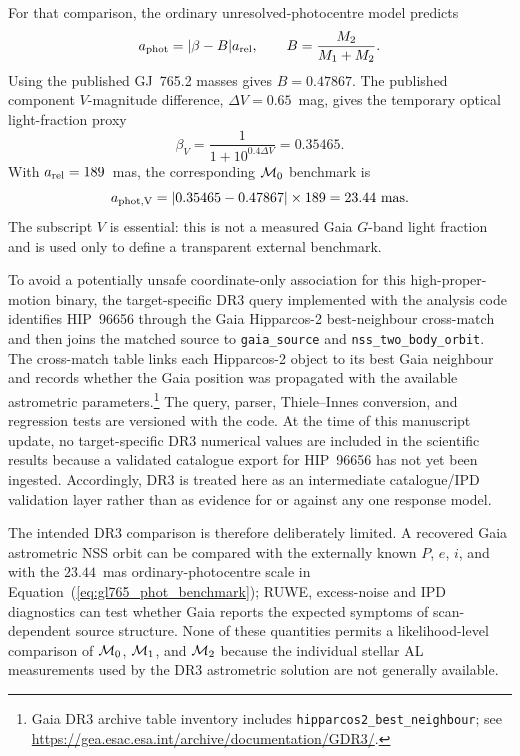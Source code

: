For that comparison, the ordinary unresolved-photocentre model predicts
\begin{equation}
 a_{\rm phot}=|\beta-B|a_{\rm rel},\qquad
 B=\frac{M_2}{M_1+M_2}.
\end{equation}
Using the published GJ~765.2 masses gives $B=0.47867$. The published component $V$-magnitude difference, $\Delta V=0.65$~mag, gives the temporary optical light-fraction proxy
\begin{equation}
\beta_V=\frac{1}{1+10^{0.4\Delta V}}=0.35465.
\label{eq:gl765_beta_v}
\end{equation}
With $a_{\rm rel}=189$~mas, the corresponding $\mathcal{M}_0$ benchmark is
\begin{equation}
 a_{\rm phot,V}=|0.35465-0.47867|\times189
 =23.44~{\rm mas}.
\label{eq:gl765_phot_benchmark}
\end{equation}
The subscript $V$ is essential: this is not a measured Gaia $G$-band light fraction and is used only to define a transparent external benchmark.

To avoid a potentially unsafe coordinate-only association for this high-proper-motion binary, the target-specific DR3 query implemented with the analysis code identifies HIP~96656 through the Gaia Hipparcos-2 best-neighbour cross-match and then joins the matched source to \texttt{gaia\_source} and \texttt{nss\_two\_body\_orbit}. The cross-match table links each Hipparcos-2 object to its best Gaia neighbour and records whether the Gaia position was propagated with the available astrometric parameters.\footnote{Gaia DR3 archive table inventory includes \texttt{hipparcos2\_best\_neighbour}; see \url{https://gea.esac.esa.int/archive/documentation/GDR3/}.} The query, parser, Thiele--Innes conversion, and regression tests are versioned with the code. At the time of this manuscript update, no target-specific DR3 numerical values are included in the scientific results because a validated catalogue export for HIP~96656 has not yet been ingested. Accordingly, DR3 is treated here as an intermediate catalogue/IPD validation layer rather than as evidence for or against any one response model.

The intended DR3 comparison is therefore deliberately limited. A recovered Gaia astrometric NSS orbit can be compared with the externally known $P$, $e$, $i$, and with the $23.44$~mas ordinary-photocentre scale in Equation~(\ref{eq:gl765_phot_benchmark}); RUWE, excess-noise and IPD diagnostics can test whether Gaia reports the expected symptoms of scan-dependent source structure. None of these quantities permits a likelihood-level comparison of $\mathcal{M}_0$, $\mathcal{M}_1$, and $\mathcal{M}_2$ because the individual stellar AL measurements used by the DR3 astrometric solution are not generally available.

